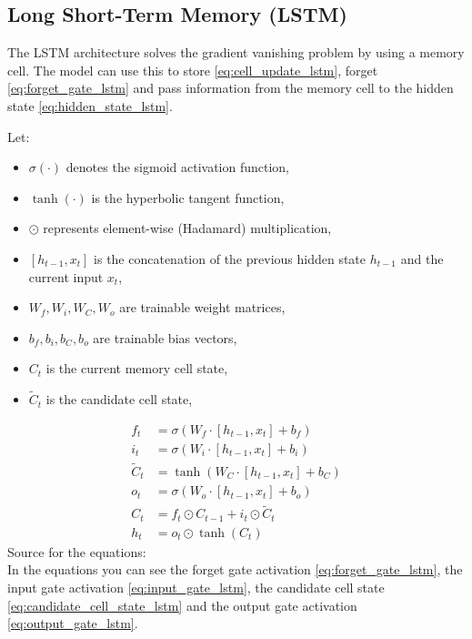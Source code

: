 \documentclass{article}
\begin{document}
\subsection{Long Short-Term Memory (LSTM)}
The LSTM architecture solves the gradient vanishing problem by using a memory cell. The model can use this to store \eqref{eq:cell_update_lstm}, forget \eqref{eq:forget_gate_lstm} and pass information from the memory cell to the hidden state \eqref{eq:hidden_state_lstm}.

Let: 
\begin{itemize}
    \item $\sigma(\cdot)$ denotes the sigmoid activation function,
    \item $\tanh(\cdot)$ is the hyperbolic tangent function,
    \item $\odot$ represents element-wise (Hadamard) multiplication,
    \item $[h_{t-1}, x_t]$ is the concatenation of the previous hidden state $h_{t-1}$ and the current input $x_t$,
    \item $W_f, W_i, W_C, W_o$ are trainable weight matrices,
    \item $b_f, b_i, b_C, b_o$ are trainable bias vectors,
    \item $C_t$ is the current memory cell state,
    \item $\tilde{C}_t$ is the candidate cell state,
\end{itemize}

\begin{align}
    f_t &= \sigma\!\left(W_f \cdot [h_{t-1}, x_t] + b_f\right) \label{eq:forget_gate_lstm} \\
    i_t &= \sigma\!\left(W_i \cdot [h_{t-1}, x_t] + b_i\right) \label{eq:input_gate_lstm} \\
    \tilde{C}_t &= \tanh\!\left(W_C \cdot [h_{t-1}, x_t] + b_C\right) \label{eq:candidate_cell_state_lstm} \\
    o_t &= \sigma\!\left(W_o \cdot [h_{t-1}, x_t] + b_o\right) \label{eq:output_gate_lstm}\\    
    C_t &= f_t \odot C_{t-1} + i_t \odot \tilde{C}_t \label{eq:cell_update_lstm}\\
    h_t &= o_t \odot \tanh(C_t) \label{eq:hidden_state_lstm}
\end{align}
Source for the equations: \cite{geeksforgeeks_lstm}
\\[2em]
In the equations you can see the forget gate activation \eqref{eq:forget_gate_lstm}, the input gate activation \eqref{eq:input_gate_lstm}, the candidate cell state \eqref{eq:candidate_cell_state_lstm} and the output gate activation \eqref{eq:output_gate_lstm}.
\end{document}
